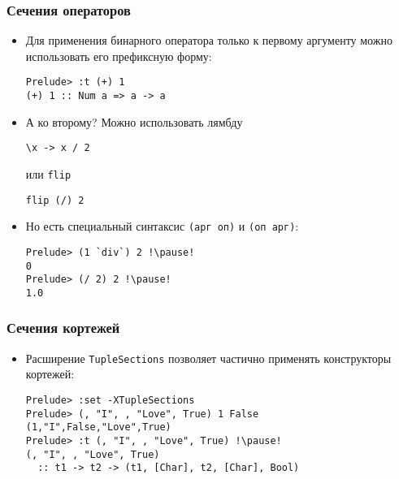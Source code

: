 \documentclass[10pt]{beamer}
\begin{document}
\begin{frame}[fragile]
\frametitle{Сечения операторов}
\begin{itemize}
    \item Для применения бинарного оператора только к первому аргументу можно использовать его префиксную форму:
\begin{lstlisting}
Prelude> :t (+) 1
(+) 1 :: Num a => a -> a
\end{lstlisting}\pause
    \item А ко второму? Можно использовать лямбду
\begin{lstlisting}
\x -> x / 2
\end{lstlisting}
или \lstinline|flip|
\begin{lstlisting}
flip (/) 2
\end{lstlisting}\pause
    \item Но есть специальный синтаксис \lstinline|(арг оп)| и \lstinline|(оп арг)|:
\begin{lstlisting}
Prelude> (1 `div`) 2 !\pause!
0
Prelude> (/ 2) 2 !\pause!
1.0
\end{lstlisting}
\end{itemize}
\end{frame}

\begin{frame}[fragile]
\frametitle{Сечения кортежей}
\begin{itemize}
    \item Расширение \lstinline|TupleSections| позволяет частично применять конструкторы кортежей:
\begin{lstlisting}
Prelude> :set -XTupleSections
Prelude> (, "I", , "Love", True) 1 False
(1,"I",False,"Love",True)
Prelude> :t (, "I", , "Love", True) !\pause!
(, "I", , "Love", True)
  :: t1 -> t2 -> (t1, [Char], t2, [Char], Bool)
\end{lstlisting}
\end{itemize}
\end{frame}
\end{document}
